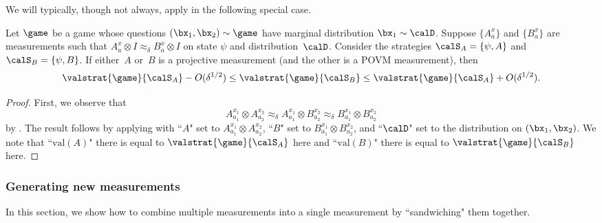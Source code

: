 We will typically, though not always,
apply  in the following special case.

\begin{fact}\label{fact:approx-delta-game-value}
Let $\game$ be a game whose questions $(\bx_1, \bx_2) \sim \game$ have marginal distribution $\bx_1 \sim \calD$.
Suppose $\{A_a^x\}$
and $\{B_a^x\}$ are measurements such that
$
A_a^x  \otimes I \approx_\delta B_a^x \otimes I
$
on state $\psi$ and distribution~$\calD$.
Consider the strategies $\calS_A = \{\psi, A\}$ and $\calS_B = \{\psi, B\}$.
If either~$A$ or~$B$ is a projective measurement (and the other is a POVM measurement), then
\begin{equation*}
\valstrat{\game}{\calS_A} - O(\delta^{1/2}) \leq \valstrat{\game}{\calS_B} \leq \valstrat{\game}{\calS_A} + O(\delta^{1/2}).
\end{equation*}
\end{fact}
\begin{proof}
First, we observe that
\begin{equation*}
A^{x_1}_{a_1} \otimes A^{x_2}_{a_2}
\approx_{\delta} A^{x_1}_{a_1} \otimes B^{x_2}_{a_2}
\approx_{\delta} B^{x_1}_{a_1} \otimes B^{x_2}_{a_2}
\end{equation*}
by .
The result follows by applying  with
``$A$" set to $A^{x_1}_{a_1} \otimes A^{x_2}_{a_2}$,
``$B$" set to $B^{x_1}_{a_1} \otimes B^{x_2}_{a_2}$,
and ``$\calD$" set to the distribution on $(\bx_1, \bx_2)$.
We note that ``$\mathrm{val}(A)$" there is equal to $\valstrat{\game}{\calS_A}$ here and
``$\mathrm{val}(B)$" there is equal to $\valstrat{\game}{\calS_B}$ here.
\end{proof}

\subsubsection{Generating new measurements}

In this section, we show how to combine multiple measurements into a single measurement by ``sandwiching" them together.

